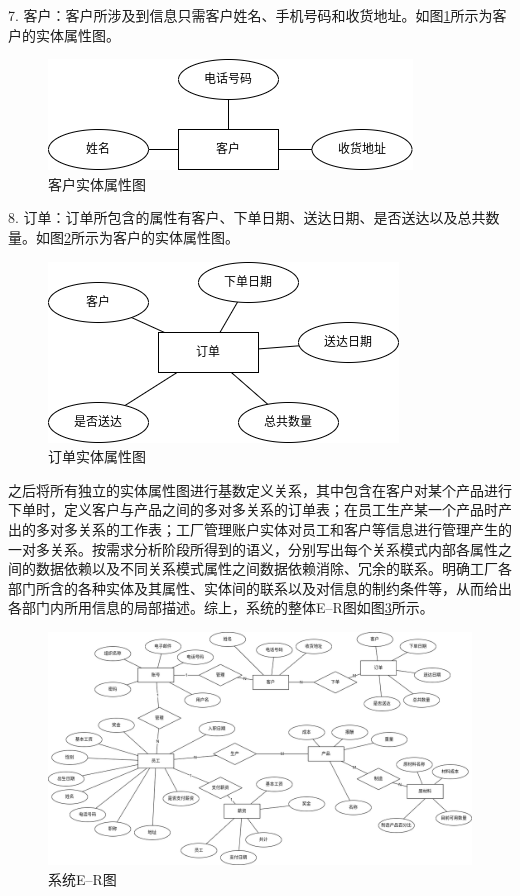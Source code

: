 7. 客户：客户所涉及到信息只需客户姓名、手机号码和收货地址。如图\ref{fig:4cstmerf}所示为客户的实体属性图。

\begin{figure}[H]
    \centering
    \includegraphics[width=.45\textwidth]{figures/4cstmerf.png}
    \caption{客户实体属性图}
    \label{fig:4cstmerf}
\end{figure}

8. 订单：订单所包含的属性有客户、下单日期、送达日期、是否送达以及总共数量。如图\ref{fig:4oderf}所示为客户的实体属性图。

\begin{figure}[H]
    \centering
    \includegraphics[width=.45\textwidth]{figures/4oderf.png}
    \caption{订单实体属性图}
    \label{fig:4oderf}
\end{figure}

之后将所有独立的实体属性图进行基数定义关系，其中包含在客户对某个产品进行下单时，定义客户与产品之间的多对多关系的订单表；在员工生产某一个产品时产出的多对多关系的工作表；工厂管理账户实体对员工和客户等信息进行管理产生的一对多关系。按需求分析阶段所得到的语义，分别写出每个关系模式内部各属性之间的数据依赖以及不同关系模式属性之间数据依赖消除、冗余的联系。明确工厂各部门所含的各种实体及其属性、实体间的联系以及对信息的制约条件等，从而给出各部门内所用信息的局部描述。综上，系统的整体E--R图如图\ref{fig:4totalerf}所示。

\begin{figure}[H]
    \centering
    \includegraphics[width=\textwidth]{figures/4totalerf.png}
    \caption{系统E--R图}
    \label{fig:4totalerf}
\end{figure}

